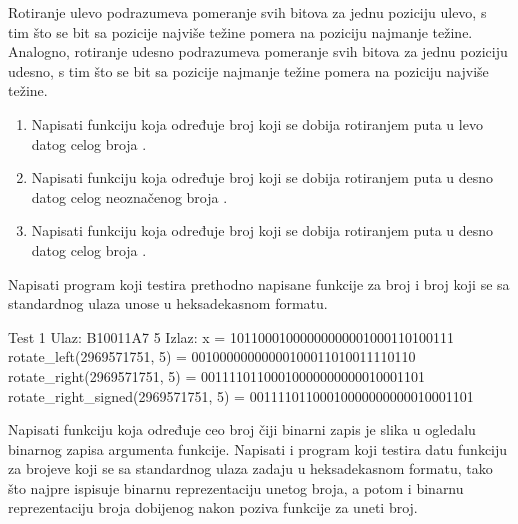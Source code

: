 \begin{Exercise}[label=004]
\begin{Exercise}[label=205]
Rotiranje ulevo podrazumeva pomeranje svih bitova za jednu poziciju ulevo, s tim što se bit sa pozicije najviše težine pomera na poziciju najmanje težine. Analogno, rotiranje udesno podrazumeva pomeranje svih bitova za jednu poziciju udesno, s tim što se bit sa pozicije najmanje težine pomera na poziciju najviše težine.
\begin{enumerate}
\item Napisati funkciju  koja određuje broj koji se dobija rotiranjem  puta u levo datog celog broja . 
\item Napisati funkciju  koja određuje broj koji se dobija rotiranjem  puta u desno datog celog neoznačenog broja . 
\item Napisati funkciju  koja određuje broj koji se dobija rotiranjem  puta u desno datog celog broja . 
\end{enumerate}
Napisati program koji testira prethodno napisane funkcije za broj  i broj  koji se sa standardnog ulaza unose u heksadekasnom formatu.

\begin{maxitest}
\begin{test}{Test 1}
Ulaz:   B10011A7 5   
Izlaz:  
  x                                      = 10110001000000000001000110100111
  rotate_left(2969571751,     5)         = 00100000000000100011010011110110
  rotate_right(2969571751,     5)        = 00111101100010000000000010001101
  rotate_right_signed(2969571751,     5) = 00111101100010000000000010001101
\end{test}
\end{maxitest}

\end{Exercise}
\begin{Answer}[ref=205]
\end{Answer}

\begin{Exercise}[label=206]
Napisati funkciju  koja određuje ceo broj čiji binarni zapis je slika u ogledalu binarnog zapisa argumenta funkcije. Napisati i program koji testira datu funkciju za brojeve koji se sa standardnog ulaza zadaju u heksadekasnom formatu, tako što najpre ispisuje binarnu reprezentaciju unetog broja, a potom i binarnu reprezentaciju broja dobijenog nakon poziva funkcije  za uneti broj.


\end{Exercise}
\end{Exercise}

